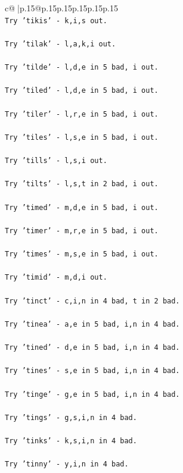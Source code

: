 \documentclass{article}
\begin{document}
{\begin{supertabular}{c@{$\;$}|p{.15\linewidth}@{}p{.15\linewidth}p{.15\linewidth}p{.15\linewidth}p{.15\linewidth}p{.15\linewidth}}
{{{\\ 
\texttt{Try 'tikis' {-} k,i,s out.} \\
\\ 
\texttt{Try 'tilak' {-} l,a,k,i out.} \\
\\ 
\texttt{Try 'tilde' {-} l,d,e in 5 bad, i out.} \\
\\ 
\texttt{Try 'tiled' {-} l,d,e in 5 bad, i out.} \\
\\ 
\texttt{Try 'tiler' {-} l,r,e in 5 bad, i out.} \\
\\ 
\texttt{Try 'tiles' {-} l,s,e in 5 bad, i out.} \\
\\ 
\texttt{Try 'tills' {-} l,s,i out.} \\
\\ 
\texttt{Try 'tilts' {-} l,s,t in 2 bad, i out.} \\
\\ 
\texttt{Try 'timed' {-} m,d,e in 5 bad, i out.} \\
\\ 
\texttt{Try 'timer' {-} m,r,e in 5 bad, i out.} \\
\\ 
\texttt{Try 'times' {-} m,s,e in 5 bad, i out.} \\
\\ 
\texttt{Try 'timid' {-} m,d,i out.} \\
\\ 
\texttt{Try 'tinct' {-} c,i,n in 4 bad, t in 2 bad.} \\
\\ 
\texttt{Try 'tinea' {-} a,e in 5 bad, i,n in 4 bad.} \\
\\ 
\texttt{Try 'tined' {-} d,e in 5 bad, i,n in 4 bad.} \\
\\ 
\texttt{Try 'tines' {-} s,e in 5 bad, i,n in 4 bad.} \\
\\ 
\texttt{Try 'tinge' {-} g,e in 5 bad, i,n in 4 bad.} \\
\\ 
\texttt{Try 'tings' {-} g,s,i,n in 4 bad.} \\
\\ 
\texttt{Try 'tinks' {-} k,s,i,n in 4 bad.} \\
\\ 
\texttt{Try 'tinny' {-} y,i,n in 4 bad.} \\
}}}
\end{supertabular}}
\end{document}
